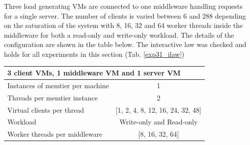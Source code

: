 \documentclass[report.tex]{subfiles}
\begin{document}
Three load generating VMs are connected to one middleware handling requests for a single server. 
The number of clients is varied between 6 and 288 depending on the saturation of the system with 8, 16, 32 and 64 worker threads inside the 
middleware for both a read-only and write-only workload. The details of the configuration are shown in the table below.
The interactive law was checked and holds for all experiments in this section (Tab. \ref{exp31_ilaw})

\begin{center}
	\scriptsize{
		\begin{tabular}{|l|c|}
			\multicolumn{2}{l}{3 client VMs, 1 middleware VM and 1 server VM}\\
			\hline Instances of memtier per machine & 1                        \\ 
			\hline Threads per memtier instance     & 2                        \\
			\hline Virtual clients per thread       & [1, 2, 4, 8, 12, 16, 24, 32, 48] \\ 
			\hline Workload                         & Write-only and Read-only \\
			\hline Worker threads per middleware    & [8, 16, 32, 64]                  \\
			\hline 
		\end{tabular}
	} 
\end{center}
\end{document}
